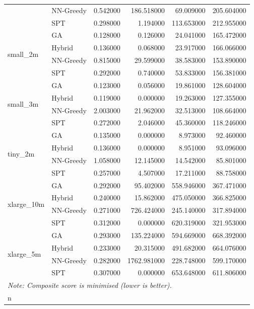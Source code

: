 \begin{tabular}{llrrrr}
 & NN-Greedy & 0.542000 & 186.518000 & 69.009000 & 205.604000 \\
 & SPT & 0.298000 & 1.194000 & 113.653000 & 212.955000 \\
\cline{1-6}
\multirow[t]{4}{*}{small_2m} & GA & 0.128000 & 0.126000 & 24.041000 & 165.472000 \\
 & Hybrid & 0.136000 & 0.068000 & 23.917000 & 166.066000 \\
 & NN-Greedy & 0.815000 & 29.599000 & 38.583000 & 153.890000 \\
 & SPT & 0.292000 & 0.740000 & 53.833000 & 156.381000 \\
\cline{1-6}
\multirow[t]{4}{*}{small_3m} & GA & 0.123000 & 0.056000 & 19.861000 & 128.604000 \\
 & Hybrid & 0.119000 & 0.000000 & 19.263000 & 127.355000 \\
 & NN-Greedy & 2.003000 & 21.962000 & 32.513000 & 108.664000 \\
 & SPT & 0.272000 & 2.046000 & 45.360000 & 118.246000 \\
\cline{1-6}
\multirow[t]{4}{*}{tiny_2m} & GA & 0.135000 & 0.000000 & 8.973000 & 92.460000 \\
 & Hybrid & 0.136000 & 0.000000 & 8.951000 & 93.096000 \\
 & NN-Greedy & 1.058000 & 12.145000 & 14.542000 & 85.801000 \\
 & SPT & 0.257000 & 4.507000 & 17.211000 & 88.758000 \\
\cline{1-6}
\multirow[t]{4}{*}{xlarge_10m} & GA & 0.292000 & 95.402000 & 558.946000 & 367.471000 \\
 & Hybrid & 0.240000 & 15.862000 & 475.050000 & 366.825000 \\
 & NN-Greedy & 0.271000 & 726.424000 & 245.140000 & 317.894000 \\
 & SPT & 0.312000 & 0.000000 & 620.319000 & 321.953000 \\
\cline{1-6}
\multirow[t]{4}{*}{xlarge_5m} & GA & 0.293000 & 135.224000 & 594.669000 & 668.392000 \\
 & Hybrid & 0.233000 & 20.315000 & 491.682000 & 664.076000 \\
 & NN-Greedy & 0.282000 & 1762.981000 & 228.748000 & 599.170000 \\
 & SPT & 0.307000 & 0.000000 & 653.648000 & 611.806000 \\
\cline{1-6}
\bottomrule
\multicolumn{5}{l}{\small\textit{Note: Composite score is minimised (lower is better).}}\\n
\end{tabular}
